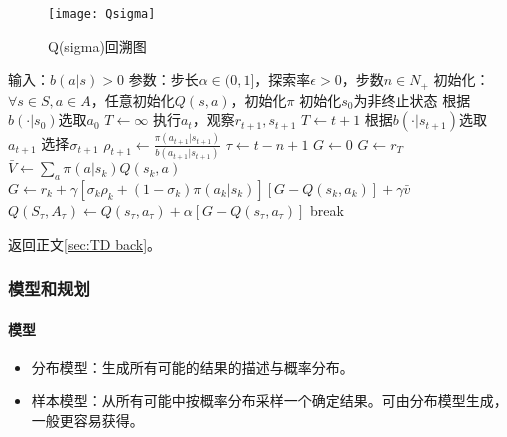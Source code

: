 \documentclass[
12pt, %
a4paper, 
oneside, %
headinclude,footinclude, %
]{scrartcl}
\begin{document}
\begin{figure}[H]
\centering
\texttt{[image: Qsigma]}
\caption[Q(sigma)回溯图]{Q(sigma)回溯图}
\end{figure}
\begin{myalgorithm}
\State 输入：$ b(a|s) > 0 $
\State 参数：步长$ \alpha \in (0,1] $，探索率$ \epsilon > 0 $，步数$ n \in N_+ $
\State 初始化：$ \forall s \in S, a \in A $，任意初始化$ Q(s, a) $，初始化$ \pi $
\State 初始化$ s_0 $为非终止状态
\State 根据$ b(\cdot|s_0) $选取$ a_0 $
\State $ T \gets \infty $
\State 执行$ a_t $，观察$ r_{t + 1}, s_{t + 1} $
\State $ T \gets t + 1 $
\Else
\State 根据$ b(\cdot|s_{t + 1}) $选取$ a_{t + 1} $
\State 选择$ \sigma_{t + 1} $ 
\State $ \rho_{t + 1} \gets \frac{\pi(a_{t + 1}|s_{t + 1})}{b(a_{t + 1}|s_{t + 1})}$ 
\EndIf
\EndIf
\State $ \tau \gets t - n + 1 $ 
\State $ G \gets 0 $
\State $ G \gets r_T $
\Else
\State $ \bar{V} \gets \sum_a \pi(a|s_k)Q(s_k, a) $ 
\State $ G \gets r_k + \gamma[\sigma_k \rho_k + (1 - \sigma_k)\pi(a_k|s_k)][G - Q(s_k, a_k)] + \gamma\bar{v} $
\EndIf
\EndFor
\State $ Q(S_{\tau},A_{\tau}) \gets Q(s_{\tau}, a_{\tau}) + \alpha[G - Q(s_{\tau}, a_{\tau})] $
\EndIf
{}
\State break
\EndIf
\EndFor
\EndFor
\end{myalgorithm}

返回正文\ref{sec:TD back}。
\subsubsection[模型和规划]{模型和规划}\label{sec:table}
\paragraph{模型}
\begin{itemize}
\item 分布模型：生成所有可能的结果的描述与概率分布。
\item 样本模型：从所有可能中按概率分布采样一个确定结果。可由分布模型生成，一般更容易获得。
\end{itemize}
\end{document}
